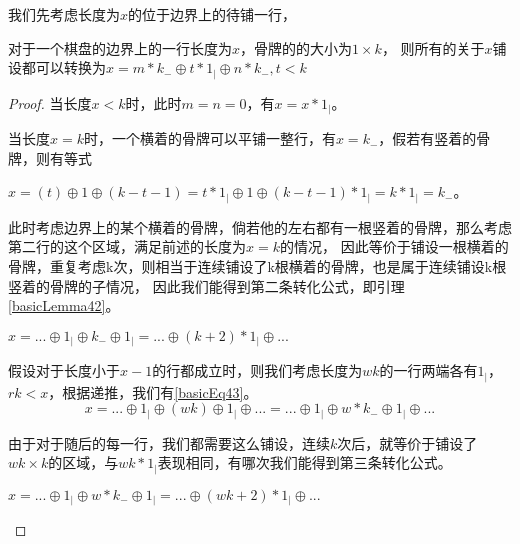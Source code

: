 我们先考虑长度为$x$的位于边界上的待铺一行，
\begin{theorem}
    对于一个棋盘的边界上的一行长度为$x$，骨牌的的大小为$1 \times k$，
    则所有的关于$x$铺设都可以转换为$x = m * k_{-} \oplus t * 1_{\vert} \oplus n * k_{-}, t < k$
    \label{basic-theorem-4}
\end{theorem}
\begin{proof}

    当长度$x < k$时，此时$m = n = 0$，有$x = x * 1_{\vert}$。

    当长度$x = k$时，一个横着的骨牌可以平铺一整行，有$x = k_{-}$，假若有竖着的骨牌，则有等式

    $x = (t) \oplus 1 \oplus (k - t - 1) = t * 1_{\vert} \oplus 1 \oplus (k - t - 1) * 1_{\vert}= k * 1_{\vert} = k_{-}$。

    此时考虑边界上的某个横着的骨牌，倘若他的左右都有一根竖着的骨牌，那么考虑第二行的这个区域，满足前述的长度为$x = k$的情况，
    因此等价于铺设一根横着的骨牌，重复考虑k次，则相当于连续铺设了k根横着的骨牌，也是属于连续铺设k根竖着的骨牌的子情况，
    因此我们能得到第二条转化公式，即引理\ref{basicLemma42}。

    \begin{lemma}
        $x = ... \oplus 1_{\vert} \oplus  k_{-} \oplus 1_{\vert} = ... \oplus (k + 2) * 1_{\vert} \oplus ...$
        \label{basicLemma42}
    \end{lemma}

    假设对于长度小于$x - 1$的行都成立时，则我们考虑长度为$wk$的一行两端各有$1_{\vert}$，$rk < x$，根据递推，我们有\ref*{basicEq43}。
    \begin{equation}
        x = ... \oplus 1_{\vert} \oplus  (wk) \oplus 1_{\vert} \oplus ... = ... \oplus 1_{\vert} \oplus  w * k_{-} \oplus 1_{\vert} \oplus ...
        \label{basicEq43}
    \end{equation}

    由于对于随后的每一行，我们都需要这么铺设，连续$k$次后，就等价于铺设了$wk \times k$的区域，与$wk * 1_{\vert}$表现相同，有哪次我们能得到第三条转化公式。

    \begin{lemma}
        $x = ... \oplus 1_{\vert} \oplus  w * k_{-} \oplus 1_{\vert} = ... \oplus (wk + 2) * 1_{\vert} \oplus ...$
        \label{basicLemma43}
    \end{lemma}


\end{proof}
